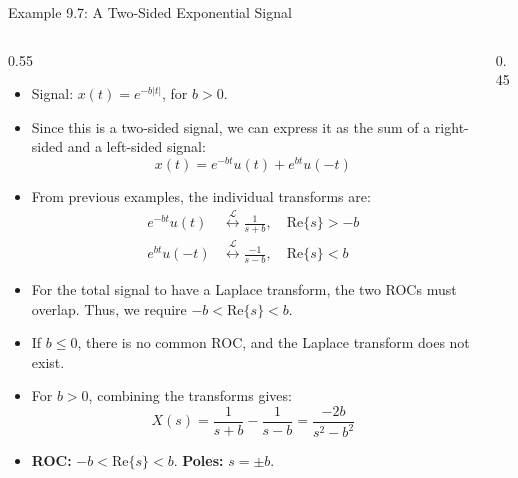 \begin{frame}{Example 9.7: A Two-Sided Exponential Signal}
    \begin{columns}[T]
        \begin{column}{0.55\textwidth}
            \begin{itemize}
                \item Signal: $x(t) = e^{-b|t|}$, for $b > 0$.
                \item Since this is a two-sided signal, we can express it as the sum of a right-sided and a left-sided signal:
                      \begin{equation*}
                          x(t) = e^{-bt}u(t) + e^{bt}u(-t)
                      \end{equation*}
                \item From previous examples, the individual transforms are:
                      \begin{align*}
                          e^{-bt}u(t) & \overset{{\mathcal{L}}}{\longleftrightarrow} \frac{1}{s+b}, \quad \text{Re}\{s\} > -b \\
                          e^{bt}u(-t) & \overset{{\mathcal{L}}}{\longleftrightarrow} \frac{-1}{s-b}, \quad \text{Re}\{s\} < b
                      \end{align*}
                \item For the total signal to have a Laplace transform, the two ROCs must overlap. Thus, we require $-b < \text{Re}\{s\} < b$.
                \item If $b \le 0$, there is no common ROC, and the Laplace transform does not exist.
                \item For $b > 0$, combining the transforms gives:
                      \begin{equation*}
                          X(s) = \frac{1}{s+b} - \frac{1}{s-b} = \frac{-2b}{s^2 - b^2}
                      \end{equation*}
                \item \textbf{ROC:} $-b < \text{Re}\{s\} < b$. \quad \textbf{Poles:} $s = \pm b$.
            \end{itemize}
        \end{column}
        \begin{column}{0.45\textwidth}


\end{column}
\end{columns}
\end{frame}
